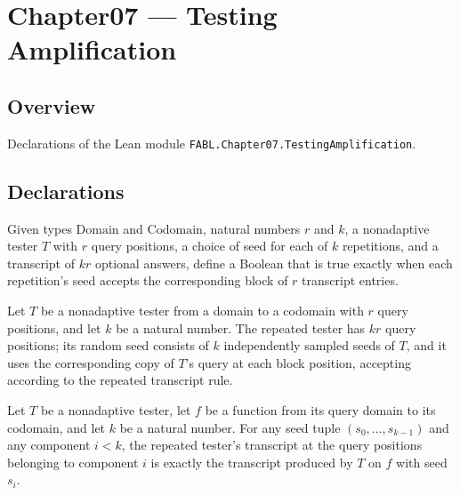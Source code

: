 \chapter{Chapter07 — Testing Amplification}
\section{Overview}

Declarations of the Lean module \texttt{FABL.Chapter07.TestingAmplification}.

\section{Declarations}

\begin{definition}
\label{FABL.repeatAllTranscriptAccept}
\leanok
{}
Given types $\mathrm{Domain}$ and $\mathrm{Codomain}$, natural numbers $r$ and $k$, a
nonadaptive tester $T$ with $r$ query positions, a choice of seed for each of $k$
repetitions, and a transcript of $kr$ optional answers, define a Boolean that is true
exactly when each repetition's seed accepts the corresponding block of $r$ transcript
entries.
\end{definition}

\begin{definition}
\label{FABL.repeatAndFunctionTester}
\leanok
{}
Let $T$ be a nonadaptive tester from a domain to a codomain with $r$ query positions,
and let $k$ be a natural number. The repeated tester has $kr$ query positions; its
random seed consists of $k$ independently sampled seeds of $T$, and it uses the
corresponding copy of $T$'s query at each block position, accepting according to the
repeated transcript rule.
\end{definition}

\begin{theorem}
\label{FABL.repeatAndFunctionTester_componentTranscript}
\leanok
{}
Let $T$ be a nonadaptive tester, let $f$ be a function from its query domain to its
codomain, and let $k$ be a natural number. For any seed tuple $(s_0,\ldots,s_{k-1})$ and
any component $i<k$, the repeated tester's transcript at the query positions belonging
to component $i$ is exactly the transcript produced by $T$ on $f$ with seed $s_i$.
\end{theorem}

